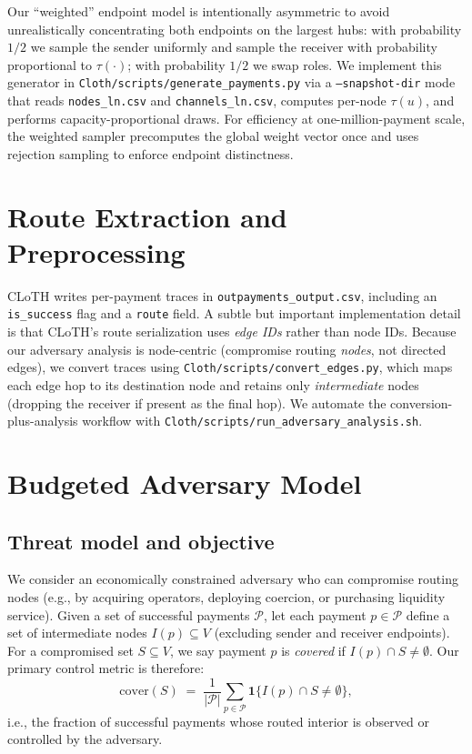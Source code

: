 \documentclass{article}
\begin{document}
Our ``weighted'' endpoint model is intentionally asymmetric to avoid unrealistically concentrating both endpoints on the largest hubs:
with probability $1/2$ we sample the sender uniformly and sample the receiver with probability proportional to $\tau(\cdot)$; with probability $1/2$ we swap roles.
We implement this generator in \texttt{Cloth/scripts/generate\_payments.py} via a \texttt{--snapshot-dir} mode that reads \texttt{nodes\_ln.csv} and \texttt{channels\_ln.csv}, computes per-node $\tau(u)$, and performs capacity-proportional draws.
For efficiency at one-million-payment scale, the weighted sampler precomputes the global weight vector once and uses rejection sampling to enforce endpoint distinctness.

\section{Route Extraction and Preprocessing}
\label{sec:preprocess}

CLoTH writes per-payment traces in \texttt{outpayments\_output.csv}, including an \texttt{is\_success} flag and a \texttt{route} field.
A subtle but important implementation detail is that CLoTH's route serialization uses \emph{edge IDs} rather than node IDs.
Because our adversary analysis is node-centric (compromise routing \emph{nodes}, not directed edges), we convert traces using \texttt{Cloth/scripts/convert\_edges.py}, which maps each edge hop to its destination node and retains only \emph{intermediate} nodes (dropping the receiver if present as the final hop).
We automate the conversion-plus-analysis workflow with \texttt{Cloth/scripts/run\_adversary\_analysis.sh}.

\section{Budgeted Adversary Model}
\label{sec:adversary}

\subsection{Threat model and objective}
We consider an economically constrained adversary who can compromise routing nodes (e.g., by acquiring operators, deploying coercion, or purchasing liquidity service).
Given a set of successful payments $\mathcal{P}$, let each payment $p \in \mathcal{P}$ define a set of intermediate nodes $I(p) \subseteq V$ (excluding sender and receiver endpoints).
For a compromised set $S \subseteq V$, we say payment $p$ is \emph{covered} if $I(p)\cap S \neq \emptyset$.
Our primary control metric is therefore:
\[
\mathrm{cover}(S) \;=\; \frac{1}{|\mathcal{P}|}\sum_{p\in\mathcal{P}} \mathbf{1}\{I(p)\cap S \neq \emptyset\},
\]
i.e., the fraction of successful payments whose routed interior is observed or controlled by the adversary.
\end{document}
